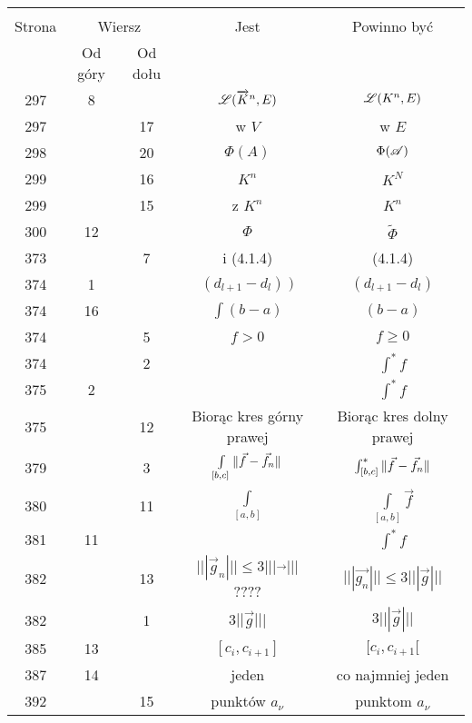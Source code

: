 \documentclass[a4paper,11pt]{article}
\numberwithin{equation}{section}
\begin{document}
\begin{center}
  \begin{tabular}{|c|c|c|c|c|}
    \hline
    & \multicolumn{2}{c|}{} & & \\
    Strona & \multicolumn{2}{c|}{Wiersz} & Jest
                              & Powinno być \\ \cline{2-3}
    & Od góry & Od dołu & & \\
    \hline
    297 &  8 & & $\mathcal{L}( \overrightarrow{ K }^{ n }, E )$
           & $\mathcal{L}( K^{ n }, E )$ \\
    297 & & 17 & w $V$ & w $E$ \\
    298 & & 20 & $\Phi( A )$ & $\Phi( \mathcal{A} )$ \\
    299 & & 16 & $K^{ n }$ & $K^{ N }$ \\
    299 & & 15 & z $K^{ n }$ & $K^{ n }$ \\
    300 & 12 & & $\Phi$ & $\tilde{ \Phi }$ \\
    373 & &  7 & i (4.1.4) & (4.1.4) \\
    374 &  1 & & $( d_{ l + 1 } - d_{ l } )\; )$
           & $( d_{ l + 1 } - d_{ l } )$ \\
    374 & 16 & & $\int ( b - a )$ & $( b - a )$ \\
    374 & &  5 & $f > 0$ & $f \geq 0$ \\
    374 & &  2 & & $\int^{ * } \! f$ \\
    375 &  2 & & & $\int^{ * } \! f$ \\
    375 & & 12 & Biorąc kres górny prawej & Biorąc kres dolny prawej \\
    379 & &  3 & $\int\limits_{ [ b, c ]  } \Vert \vec{f} - \vec{f}_{ n } \Vert$
           & $\int^{ * }_{ [ b, c ]  } \Vert \vec{f} - \vec{f}_{ n } \Vert$ \\
    380 & & 11 & $\int\limits_{ [ a, b ] }$
           & $\int\limits_{ [ a, b ] } \vec{ f } $ \\
    381 & 11 & & & $\int^{ * } \! f$ \\
    382 & & 13 & $||| \vec g_{ n } ||| \leq 3 ||| \vec{ \; \; } |||$ ????
           & $||| \vec{ g_{ n } } ||| \leq 3 ||| \vec{ g } |||$ \\
    382 & &  1 & $3 || \vec{ g } |||$ & $3 ||| \vec{ g } |||$ \\
    385 & 13 & & $[ c_{ i }, c_{ i + 1 } ]$ & $[ c_{ i }, c_{ i + 1 } [$ \\
    387 & 14 & & jeden & co najmniej jeden \\
    392 & & 15 & punktów $a_{ \nu }$ & punktom $a_{ \nu }$ \\
    \hline
  \end{tabular}






\end{center}
\end{document}
